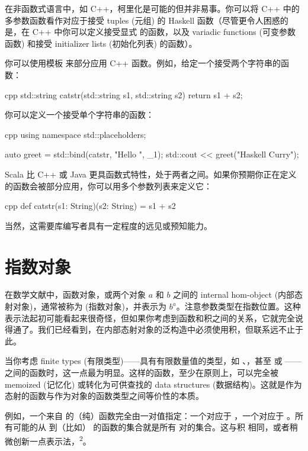在非函数式语言中，如 C++，柯里化是可能的但并非易事。你可以将 C++ 中的多参数函数看作对应于接受 tuples (元组) 的 Haskell 函数（尽管更令人困惑的是，在 C++ 中你可以定义接受显式  的函数，以及 variadic functions (可变参数函数) 和接受 initializer lists (初始化列表) 的函数）。

你可以使用模板  来部分应用 C++ 函数。例如，给定一个接受两个字符串的函数：

\begin{snip}{cpp}
std::string catstr(std::string s1, std::string s2) {
    return s1 + s2;
}
\end{snip}
你可以定义一个接受单个字符串的函数：

\begin{snip}{cpp}
using namespace std::placeholders;

auto greet = std::bind(catstr, "Hello ", _1);
std::cout << greet("Haskell Curry");
\end{snip}
Scala 比 C++ 或 Java 更具函数式特性，处于两者之间。如果你预期你正在定义的函数会被部分应用，你可以用多个参数列表来定义它：

\begin{snip}{cpp}
def catstr(s1: String)(s2: String) = s1 + s2
\end{snip}
当然，这需要库编写者具有一定程度的远见或预知能力。

\section{指数对象}

在数学文献中，函数对象，或两个对象 $a$ 和 $b$ 之间的 internal hom-object (内部态射对象)，通常被称为  (指数对象)，并表示为 $b^{a}$。注意参数类型在指数位置。这种表示法起初可能看起来很奇怪，但如果你考虑到函数和积之间的关系，它就完全说得通了。我们已经看到，在内部态射对象的泛构造中必须使用积，但联系远不止于此。

当你考虑 finite types (有限类型)——具有有限数量值的类型，如 、，甚至  或 ——之间的函数时，这一点最为明显。这样的函数，至少在原则上，可以完全被 memoized (记忆化) 或转化为可供查找的 data structures (数据结构)。这就是作为态射的函数与作为对象的函数类型之间等价性的本质。

例如，一个来自  的（纯）函数完全由一对值指定：一个对应于 ，一个对应于 。所有可能的从  到（比如） 的函数的集合就是所有  对的集合。这与积  \times{}  相同，或者稍微创新一点表示法，\textsuperscript{2}。

